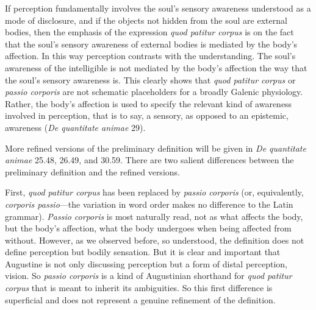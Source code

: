 \documentclass[12pt]{article}
\begin{document}
If perception fundamentally involves the soul's sensory awareness understood as a mode of disclosure, and if the objects not hidden from the soul are external bodies, then the emphasis of the expression \emph{quod patitur corpus} is on the fact that the soul's sensory awareness of external bodies is mediated by the body's affection. In this way perception contrasts with the understanding. The soul's awareness of the intelligible is not mediated by the body's affection the way that the soul's sensory awareness is. This clearly shows that \emph{quod patitur corpus} or \emph{passio corporis} are not schematic placeholders for a broadly Galenic physiology. Rather, the body's affection is used to specify the relevant kind of awareness involved in perception, that is to say, a sensory, as opposed to an epistemic, awareness (\emph{De quantitate animae} 29).

More refined versions of the preliminary definition will be given in \emph{De quantitate animae} 25.48, 26.49, and 30.59.
%
%
There are two salient differences between the preliminary definition and the refined versions.

First, \emph{quod patitur corpus} has been replaced by \emph{passio corporis} (or, equivalently, \emph{corporis passio}—the variation in word order makes no difference to the Latin grammar). \emph{Passio corporis} is most naturally read, not as what affects the body, but the body's affection, what the body undergoes when being affected from without. However, as we observed before, so understood, the definition does not define perception but bodily sensation. But it is clear and important that Augustine is not only discussing perception but a form of distal perception, vision. So \emph{passio corporis} is a kind of Augustinian shorthand for \emph{quod patitur corpus} that is meant to inherit its ambiguities. So this first difference is superficial and does not represent a genuine refinement of the definition.
\end{document}
